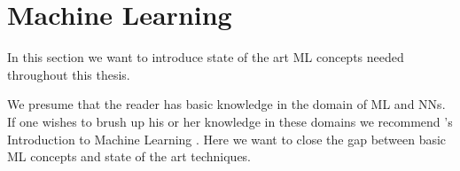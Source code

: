 \section{Machine Learning}
\label{chp:fundamentals:sec:machine_learning}
In this section we want to introduce state of the art \ac{ML} concepts needed throughout this thesis.

We presume that the reader has basic knowledge in the domain of \ac{ML} and \acp{NN}.
If one wishes to brush up his or her knowledge in these domains we recommend \citeauthor{Alpaydin:2020}'s Introduction to Machine Learning \parencite{Alpaydin:2020}.
Here we want to close the gap between basic \ac{ML} concepts and state of the art techniques.




